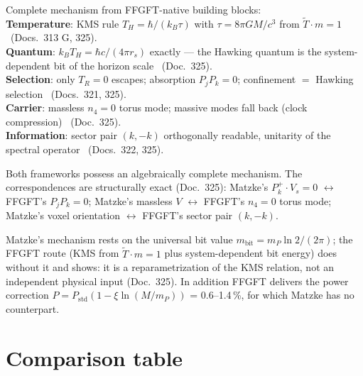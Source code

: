 \begin{tcolorbox}[ffgftbox, title={FFGFT (Doc.\ 325)}]
  Complete mechanism from FFGFT-native building blocks:\\
  \textbf{Temperature}: KMS rule $T_H = \hbar/(k_B\tau)$ with
  $\tau = 8\pi GM/c^3$ from $\tilde{T}\cdot m = 1$ \K\ (Docs.\ 313 G, 325).\\
  \textbf{Quantum}: $k_B T_H = \hbar c/(4\pi r_s)$ exactly — the Hawking
  quantum is the system-dependent bit of the horizon scale \K\ (Doc.\ 325).\\
  \textbf{Selection}: only $T_R = 0$ escapes; absorption
  $P_jP_k = 0$; confinement $=$ Hawking selection \B\ (Docs.\ 321, 325).\\
  \textbf{Carrier}: massless $n_4 = 0$ torus mode; massive modes fall
  back (clock compression) \K\ (Doc.\ 325).\\
  \textbf{Information}: sector pair $(k,-k)$ orthogonally readable,
  unitarity of the spectral operator \K\ (Docs.\ 322, 325).
\end{tcolorbox}

\begin{tcolorbox}[convbox, title={Convergence — two complete mechanisms}]
  Both frameworks possess an algebraically complete mechanism.
  The correspondences are structurally exact (Doc.\ 325):
  Matzke's $P_k^+\cdot V_s = 0$ $\leftrightarrow$ FFGFT's $P_jP_k = 0$;
  Matzke's massless $V$ $\leftrightarrow$ FFGFT's $n_4=0$ torus mode;
  Matzke's voxel orientation $\leftrightarrow$ FFGFT's sector pair $(k,-k)$.
\end{tcolorbox}

\begin{tcolorbox}[divbox, title={Divergence — the bit-value foundation}]
  Matzke's mechanism rests on the universal bit value
  $m_{\mathrm{bit}} = m_P\ln 2/(2\pi)$; the FFGFT route (KMS from
  $\tilde{T}\cdot m=1$ plus system-dependent bit energy) does
  without it and shows: it is a reparametrization of the KMS relation,
  not an independent physical input (Doc.\ 325).
  In addition FFGFT delivers the power correction
  $P = P_{\mathrm{std}}(1-\xi\ln(M/m_P))$ = 0.6--1.4\,\%,
  for which Matzke has no counterpart.
\end{tcolorbox}

\section{Comparison table}

